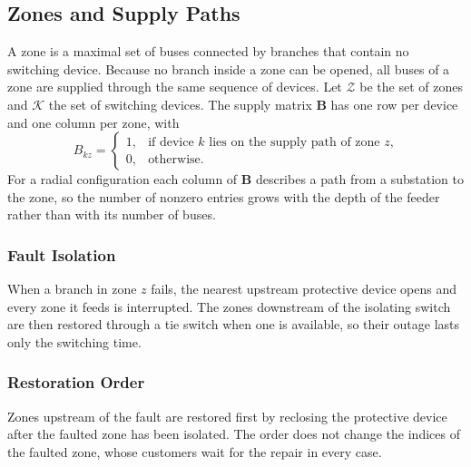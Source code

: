 \documentclass[journal]{IEEEtran}
\begin{document}
\subsection{Zones and Supply Paths}
A zone is a maximal set of buses connected by branches that contain no switching device.
Because no branch inside a zone can be opened, all buses of a zone are supplied through the same
sequence of devices. Let $\mathcal{Z}$ be the set of zones and $\mathcal{K}$ the set of
switching devices. The supply matrix $\mathbf{B}$ has one row per device and one column per
zone, with
\begin{equation}
B_{kz} =
\begin{cases}
1, & \text{if device $k$ lies on the supply path of zone $z$,}\\
0, & \text{otherwise.}
\end{cases}
\label{eq:supply}
\end{equation}
For a radial configuration each column of $\mathbf{B}$ describes a path from a substation to the
zone, so the number of nonzero entries grows with the depth of the feeder rather than with its
number of buses.

\subsubsection{Fault Isolation}
When a branch in zone $z$ fails, the nearest upstream protective device opens and every zone it
feeds is interrupted. The zones downstream of the isolating switch are then restored through a
tie switch when one is available, so their outage lasts only the switching time.

\subsubsection{Restoration Order}
Zones upstream of the fault are restored first by reclosing the protective device after the
faulted zone has been isolated. The order does not change the indices of the faulted zone, whose
customers wait for the repair in every case.
\end{document}

